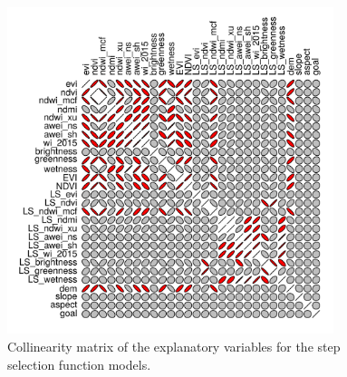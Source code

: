 \documentclass[12pt,a4paper, twoside, english]{article}
\begin{document}
\begin{figure}[H]
  \centering
  \includegraphics[width=0.85\textwidth]{figures/Collinearity_Matrix.png}
  \caption[Collinearity matrix]{Collinearity matrix of the explanatory variables for the step selection function models.}
  \label{fig:collinearity_matrix}
\end{figure}



\end{document}
